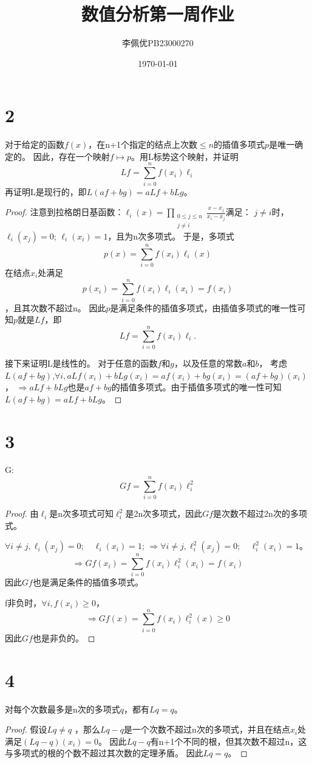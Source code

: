 \documentclass{article}
\title{数值分析第一周作业}
\date{\today}
\author{李佩优PB23000270}
\begin{document}
\maketitle
\section*{2}
对于给定的函数$f(x)$，在n+1个指定的结点上次数$\leqslant n$的插值多项式$p$是唯一确定的。
因此，存在一个映射$f\mapsto p$。用L标势这个映射，并证明
$$Lf = \sum_{i=0}^{n} f(x_i) \ell_i$$
再证明L是现行的，即$L(af+bg)=aLf+bLg$。
\begin{proof}

注意到拉格朗日基函数：$\ell_i(x)=\prod_{\substack{0\leq j\leq n\\ j\neq i}} \frac{x-x_j}{x_i-x_j}$满足：
$j\neq i$时，$\ell_i(x_j)=0$; $\ell_i(x_i)=1$，且为n次多项式。
于是，多项式$$p(x)=\sum_{i=0}^{n} f(x_i) \ell_i(x)$$
在结点$x_i$处满足$$p(x_i)=\sum_{i=0}^{n} f(x_i) \ell_i(x_i)=f(x_i)$$，且其次数不超过n。
因此$p$是满足条件的插值多项式，由插值多项式的唯一性可知$p$就是$Lf$，即$$Lf = \sum_{i=0}^{n} f(x_i) \ell_i.$$

接下来证明L是线性的。
对于任意的函数$f$和$g$，以及任意的常数$a$和$b$，
考虑$L(af+bg)$,$\forall i, aLf(x_i)+bLg(x_i)=af(x_i)+bg(x_i)=(af+bg)(x_i)$，
$\Rightarrow aLf+bLg$也是$af+bg$的插值多项式。由于插值多项式的唯一性可知$L(af+bg)=aLf+bLg$。

\end{proof}
\section*{3}
G: $$Gf = \sum_{i=0}^{n}f(x_i)\ell_i^2$$
\begin{proof}
由$\ell_i$是n次多项式可知$\ell_i^2$是2n次多项式，因此$Gf$是次数不超过2n次的多项式。

$\forall i\neq j, \ell_i(x_j)=0;\quad \ell_i(x_i)=1$;
$\Rightarrow \forall i\neq j, \ell_i^2(x_j)=0;\quad \ell_i^2(x_i)=1$。
$$\Rightarrow Gf(x_i)=\sum_{i=0}^{n}f(x_i)\ell_i^2(x_i)=f(x_i)$$
因此$Gf$也是满足条件的插值多项式。

f非负时，$\forall i, f(x_i)\geq 0$，
$$\Rightarrow Gf(x)=\sum_{i=0}^{n}f(x_i)\ell_i^2(x)\geq 0$$
因此$Gf$也是非负的。

\end{proof}
\section*{4}
对每个次数最多是n次的多项式$q$，都有$Lq=q$。
\begin{proof}
假设$Lq\neq q$
，那么$Lq-q$是一个次数不超过n次的多项式，并且在结点$x_i$处满足$(Lq-q)(x_i)=0$。
因此$Lq-q$有n+1个不同的根，但其次数不超过n，这与多项式的根的个数不超过其次数的定理矛盾。
因此$Lq=q$。
\end{proof}
\end{document}
